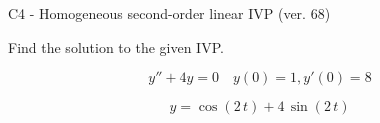 \begin{exercise}
  \begin{exerciseTitle}C4 - Homogeneous second-order linear IVP (ver. 68)\end{exerciseTitle}
  \begin{exerciseStatement}
    
Find the solution to the given IVP.

    
\[y''+4y = 0 \hspace{1em} y(0) = 1 , y'(0) = 8\]

  \end{exerciseStatement}
  \begin{exerciseAnswer}
    
\[y= \cos\left(2 \, t\right) + 4 \, \sin\left(2 \, t\right)\]

  \end{exerciseAnswer}
\end{exercise}